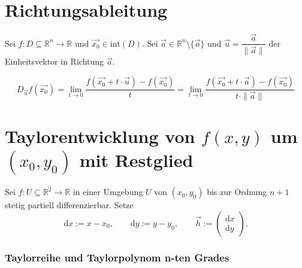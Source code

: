 \documentclass[a4paper,11pt,oneside,open=any,parskip=half, DIV=15]{scrreprt}
\begin{document}
\section{Richtungsableitung}

   Sei \(f:D\subseteq\mathbb{R}^n\to\mathbb{R}\) und \(\vec{x_0}\in\mathrm{int}(D)\). 
   Sei \(\vec{a}\in\mathbb{R}^n\setminus\{\vec{o}\}\) und 
   \(\vec{u}=\dfrac{\vec{a}}{\|\vec{a}\|}\) der Einheitsvektor in Richtung \(\vec{a}\).

         \begin{importantbox}
            \[
               D_{\vec{u}} f(\vec{x_0}) = \lim_{t \to 0} \frac{f(\vec{x_0} + t \cdot \vec{u}) - f(\vec{x_0})}{t} = \lim_{t \to 0} \frac{f(\vec{x_0} + t \cdot \vec{a}) - f(\vec{x_0})}{t \cdot \|\vec{a}\|}
            \]
         \end{importantbox}

\begingroup
\makeatletter
{}%
\makeatother

   \section[Taylorentwicklung in zwei Variablen um (x0,y0) mit Restglied]%
   {Taylorentwicklung von \texorpdfstring{\(f(x,y)\)}{f(x,y)}%
   um \texorpdfstring{\((x_0,y_0)\)}{(x0,y0)} mit Restglied}

      Sei \(f:U\subseteq\mathbb{R}^2\to\mathbb{R}\) in einer Umgebung \(U\) von \((x_0,y_0)\) bis zur Ordnung \(n+1\) stetig partiell differenzierbar.
      Setze
      \[
         \mathrm{d}x := x - x_0,\qquad \mathrm{d}y := y - y_0,\qquad \vec{h} := \begin{pmatrix} \mathrm{d}x \\ \mathrm{d}y \end{pmatrix}.
      \]

   \subsubsection*{Taylorreihe und Taylorpolynom n-ten Grades}
\end{document}
